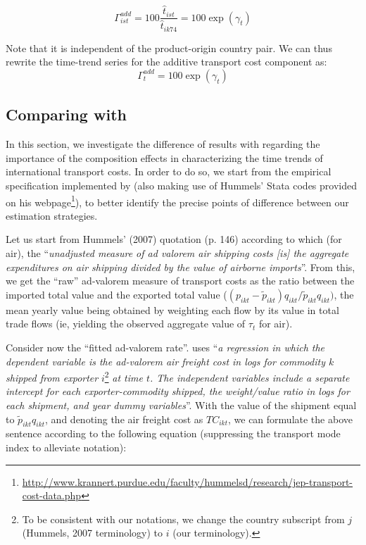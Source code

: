 \documentclass[a4paper,11pt]{article}
\begin{document}
\begin{equation}
\Gamma^{add}_{ist} = 100\frac{\widehat{t}_{ist}}{\widehat{t}_{ik74}} = 100\exp(\gamma_t) \label{eq:indice_add}
\end{equation}

\noindent Note that it is independent of the product-origin country pair. We can thus rewrite the time-trend series for the additive transport cost component as:
\begin{equation}
\Gamma^{add}_t  = 100\exp(\gamma_t) \label{eq:tcadd_compoeffect}
\end{equation}


\subsection{Comparing with \cite{hummels2007} \label{app:compare_Hummels}}

In this section, we investigate the difference of results with \cite{hummels2007} regarding the importance of the composition effects in characterizing the time trends of international transport costs.
In order to do so, we start from the empirical specification implemented by \cite{hummels2007} (also making use of Hummels' Stata codes provided on his webpage\footnote{\url{http://www.krannert.purdue.edu/faculty/hummelsd/research/jep-transport-cost-data.php}}), to better identify the precise points of difference between our estimation strategies.

Let us start from Hummels' (2007) quotation (p.
146) according to which (for air), the ``\textit{unadjusted measure of ad valorem air shipping costs [is] the aggregate expenditures on air shipping divided by the value of airborne imports}''.
From this, we get the ``raw'' ad-valorem measure of transport costs as the ratio between the imported total value and the exported total value ($(p_{ikt} - \widetilde{p}_{ikt})q_{ikt}/\widetilde{p}_{ikt}q_{ikt})$, the mean yearly value being obtained by weighting each flow by its value in total trade flows (ie, yielding the observed aggregate value of $\tau_t$ for air).

Consider now the ``fitted ad-valorem rate''.
\cite{hummels2007} uses ``\textit{a regression in which the dependent variable is the ad-valorem air freight cost in logs for commodity $k$ shipped from exporter} $i$\footnote{To be consistent with our notations, we change the country subscript from $j$ (Hummels, 2007 terminology) to $i$ (our terminology).} \textit{at time $t$.
The independent variables include a separate intercept for each exporter-commodity shipped, the weight/value ratio in logs for each shipment, and year dummy variables}''.
With the value of the shipment equal to $\widetilde{p}_{ikt}q_{ikt}$, and denoting the air freight cost as $TC_{ikt}$, we can formulate the above sentence according to the following equation (suppressing the transport mode index to alleviate notation):
\end{document}
